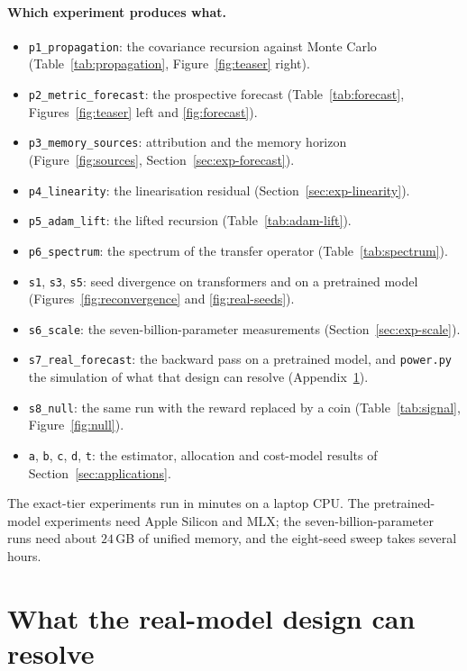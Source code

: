 \paragraph{Which experiment produces what.}
\begin{itemize}\itemsep1pt
  \item \texttt{p1\_propagation}: the covariance recursion against Monte Carlo
    (Table~\ref{tab:propagation}, Figure~\ref{fig:teaser} right).
  \item \texttt{p2\_metric\_forecast}: the prospective forecast
    (Table~\ref{tab:forecast}, Figures~\ref{fig:teaser} left and \ref{fig:forecast}).
  \item \texttt{p3\_memory\_sources}: attribution and the memory horizon
    (Figure~\ref{fig:sources}, Section~\ref{sec:exp-forecast}).
  \item \texttt{p4\_linearity}: the linearisation residual (Section~\ref{sec:exp-linearity}).
  \item \texttt{p5\_adam\_lift}: the lifted recursion (Table~\ref{tab:adam-lift}).
  \item \texttt{p6\_spectrum}: the spectrum of the transfer operator (Table~\ref{tab:spectrum}).
  \item \texttt{s1}, \texttt{s3}, \texttt{s5}: seed divergence on transformers and on a pretrained
    model (Figures~\ref{fig:reconvergence} and \ref{fig:real-seeds}).
  \item \texttt{s6\_scale}: the seven-billion-parameter measurements
    (Section~\ref{sec:exp-scale}).
  \item \texttt{s7\_real\_forecast}: the backward pass on a pretrained model, and
    \texttt{power.py} the simulation of what that design can resolve
    (Appendix~\ref{app:power}).
  \item \texttt{s8\_null}: the same run with the reward replaced by a coin
    (Table~\ref{tab:signal}, Figure~\ref{fig:null}).
  \item \texttt{a}, \texttt{b}, \texttt{c}, \texttt{d}, \texttt{t}: the estimator, allocation and
    cost-model results of Section~\ref{sec:applications}.
\end{itemize}

The exact-tier experiments run in minutes on a laptop CPU. The pretrained-model experiments need
Apple Silicon and MLX; the seven-billion-parameter runs need about $24$\,GB of unified memory, and
the eight-seed sweep takes several hours.

\section{What the real-model design can resolve}
\label{app:power}

